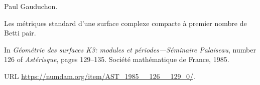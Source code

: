 Paul Gauduchon.

\newblock Les m\'etriques standard d'une surface complexe compacte \`a premier
  nombre de {Betti} pair.

\newblock In \emph{G{\'e}om{\'e}trie des surfaces K3: modules et p{\'e}riodes---S{\'e}minaire Palaiseau}, number 126 of \emph{Ast\'erisque}, pages 129--135. Soci{\'e}t{\'e} math{\'e}matique de France, 1985.

\newblock URL \url{https://numdam.org/item/AST_1985__126__129_0/}.
